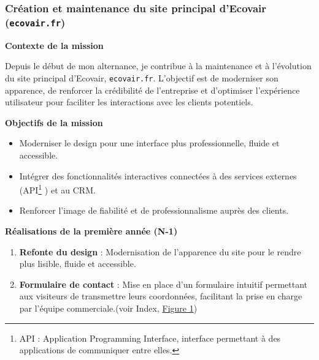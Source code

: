 \subsubsection{Création et maintenance du site principal d’Ecovair (\texttt{ecovair.fr})}

\textbf{Contexte de la mission}\vspace{0.3cm}

Depuis le début de mon alternance, je contribue à la maintenance et à l’évolution du site principal d’Ecovair, \texttt{ecovair.fr}. L’objectif est de moderniser son apparence, de renforcer la crédibilité de l’entreprise et d’optimiser l’expérience utilisateur pour faciliter les interactions avec les clients potentiels.\vspace{0.3cm}

\textbf{Objectifs de la mission}\vspace{0.3cm}

\begin{itemize}
    \item Moderniser le design pour une interface plus professionnelle, fluide et accessible.\vspace{0.3cm}
    \item Intégrer des fonctionnalités interactives connectées à des services externes (API\footnote{API : Application Programming Interface, interface permettant à des applications de communiquer entre elles.}
) et au CRM.\vspace{0.3cm}
    \item Renforcer l’image de fiabilité et de professionnalisme auprès des clients.\vspace{0.3cm}
\end{itemize}

\textbf{Réalisations de la première année (N-1)}\vspace{0.3cm}

\begin{enumerate}
    \item \textbf{Refonte du design} : Modernisation de l’apparence du site pour le rendre plus lisible, fluide et accessible.\vspace{0.3cm}
    \item \textbf{Formulaire de contact} : Mise en place d’un formulaire intuitif permettant aux visiteurs de transmettre leurs coordonnées, facilitant la prise en charge par l’équipe commerciale.(voir Index, \hyperref[fig:formulaire-contact]{Figure 1})\vspace{0.3cm}
\end{enumerate}

